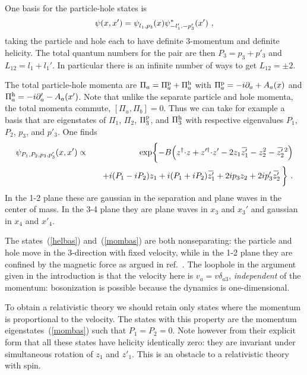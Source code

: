 \documentclass[a4paper,12pt]{article}
\newcommand{\OL}[1]{ \hspace{1pt}\overline{\hspace{-1pt}#1
   \hspace{-2pt}}\hspace{2pt} }
\begin{document}
One basis for the particle-hole states is
\begin{equation}
\psi(x,x') = \psi^{\vphantom *}_{l_1,p_3}(x) \psi^*_{-l_1',-p_3'}(x')\ ,
\label{helbas}
\end{equation}
taking the particle and hole each to have definite 3-momentum and definite
helicity.  The total quantum numbers for the pair are then $P_3 = p_3 + p'_3$
and $L_{12} = l_1 + l_1'$.  In particular there is an infinite number of
ways to get $L_{12} = \pm 2$.  

The total particle-hole momenta are $\Pi_a = \Pi^{\rm p}_a +
\Pi^{\rm h}_a$ with $\Pi^{\rm p}_a = -i \partial_a +  A_a(x)$ and $\Pi^{\rm
h}_a = -i \partial'_a -  A_a(x')$.  Note that unlike the separate
particle and hole momenta, the total momenta commute,
$[\Pi_a,
\Pi_b] = 0$.  Thus we can take for example a basis that are eigenstates
of $\Pi_1$, $\Pi_2$,
$\Pi^{\rm p}_3$, and $\Pi^{\rm h}_3$ with respective eigenvalues $P_1$,
$P_2$, $p_3$, and $p'_3$.  One finds 
\begin{eqnarray}
\psi_{P_1,P_2,p_3,p'_3}(x,x') &\propto&
\exp\biggl\{ -B\Bigl( z^\dagger{\cdot} z + z'^\dagger{\cdot} z'
- 2 z_1 \OL{z'_1} - z_2^2 - \OL{z'_2}^2 \Bigr) 
\nonumber\\
&&\quad + i (P_1 - i P_2) z_1 
+ i (P_1 + i P_2) \OL{z'_1} + 2 i p_3 z_2 +  2 i p'_3 \OL{z'_2}\, \biggr\}\
.
\label{mombas}
\end{eqnarray}
In the 1-2 plane these are gaussian in the separation and plane waves in
the center of mass.  In the 3-4 plane they are plane waves in $x_3$ and
$x_3'$ and gaussian in $x_4$ and $x'_4$.

The states~(\ref{helbas}) and~(\ref{mombas}) are both nonseparating:
the particle and hole move in the 3-direction with fixed velocity, while
in the 1-2 plane they are confined by the magnetic force as
argued in ref.~\cite{hz1}.  The loophole in the argument given in the
introduction is that the velocity here is $v_a = v \delta_{a3}$, {\it
independent} of the momentum: bosonization is possible because the
dynamics is one-dimensional. 

To obtain a relativistic theory we should retain only states where the
momentum is proportional to the velocity.  The states with this property
are the momentum eigenstates~(\ref{mombas}) such that $P_1 = P_2 = 0$. 
Note however from their explicit form that all these states have helicity
identically zero: they are invariant under simultaneous rotation of $z_1$
and $z'_1$.  This is an obstacle to a relativistic theory
with spin.  
\end{document}

